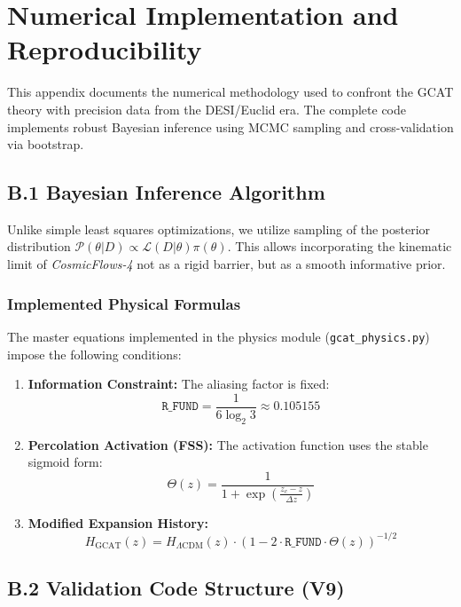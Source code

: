 \documentclass[12pt, a4paper]{article}
\theoremstyle{plain}
\theoremstyle{definition}
\begin{document}
\section{Numerical Implementation and Reproducibility}
\label{app:code}

This appendix documents the numerical methodology used to confront the GCAT theory with precision data from the DESI/Euclid era. The complete code implements robust Bayesian inference using MCMC sampling and cross-validation via bootstrap.

\subsection{B.1 Bayesian Inference Algorithm}

Unlike simple least squares optimizations, we utilize sampling of the posterior distribution $\mathcal{P}(\theta|D) \propto \mathcal{L}(D|\theta)\pi(\theta)$. This allows incorporating the kinematic limit of \textit{CosmicFlows-4} not as a rigid barrier, but as a smooth informative prior.

\subsubsection{Implemented Physical Formulas}

The master equations implemented in the physics module (\texttt{gcat\_physics.py}) impose the following conditions:

\begin{enumerate}
    \item \textbf{Information Constraint:} The aliasing factor is fixed:
    \[
    \texttt{R\_FUND} = \frac{1}{6 \log_2 3} \approx 0.105155
    \]
    
    \item \textbf{Percolation Activation (FSS):} The activation function uses the stable sigmoid form:
    \[
    \Theta(z) = \frac{1}{1 + \exp\left(\frac{z_c - z}{\Delta z}\right)}
    \]
    
    \item \textbf{Modified Expansion History:}
    \[
    H_{\text{GCAT}}(z) = H_{\Lambda\text{CDM}}(z) \cdot \left(1 - 2 \cdot \texttt{R\_FUND} \cdot \Theta(z)\right)^{-1/2}
    \]
\end{enumerate}

\subsection{B.2 Validation Code Structure (V9)}
\end{document}
